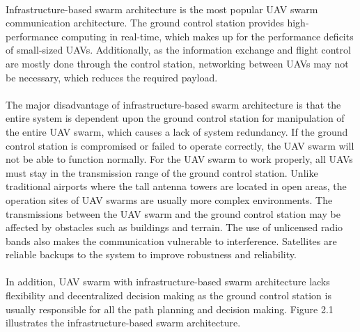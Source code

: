 \documentclass[a4paper,12pt]{report}
\begin{document}
\paragraph{}
Infrastructure-based swarm architecture is the most popular UAV swarm communication architecture\cite{bekmezci2013flying}. The ground control station provides high-performance computing in real-time, which makes up for the performance deficits of small-sized UAVs. Additionally, as the information exchange and flight control are mostly done through the control station, networking between UAVs may not be necessary, which reduces the required payload\cite{bekmezci2013flying}.

\paragraph{}
The major disadvantage of infrastructure-based swarm architecture is that the entire system is dependent upon the ground control station for manipulation of the entire UAV swarm, which causes a lack of system redundancy\cite{doi:10.1139/juvs-2018-0009}. If the ground control station is compromised or failed to operate correctly, the UAV swarm will not be able to function normally. For the UAV swarm to work properly, all UAVs must stay in the transmission range of the ground control station. Unlike traditional airports where the tall antenna towers are located in open areas, the operation sites of UAV swarms are usually more complex environments. The transmissions between the UAV swarm and the ground control station may be affected by obstacles such as buildings and terrain\cite{7470933}. The use of unlicensed radio bands also makes the communication vulnerable to interference\cite{doi:10.1139/juvs-2018-0009}. Satellites are reliable backups to the system to improve robustness and reliability\cite{7470933}.

\paragraph{}
In addition, UAV swarm with infrastructure-based swarm architecture lacks flexibility and decentralized decision making as the ground control station is usually responsible for all the path planning and decision making\cite{doi:10.1139/juvs-2018-0009}. Figure 2.1 illustrates the infrastructure-based swarm architecture.
\end{document}
